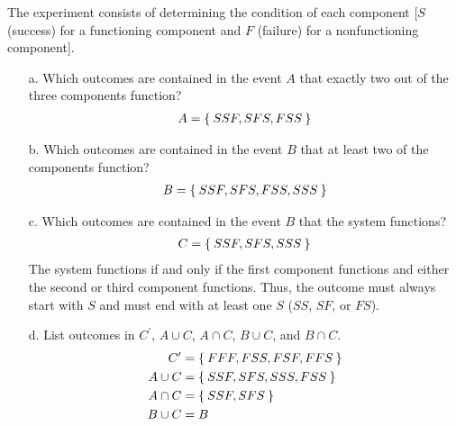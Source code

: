 \documentclass[letterpaper,12pt]{article}
\begin{document}
\begin{enumerate}
\begin{center}
    \end{center}
    The experiment consists of determining the condition of each component [$S$ (success) for a functioning component and $F$ (failure) for a nonfunctioning component].
    \begin{enumerate}
      \item[a.]
        Which outcomes are contained in the event $A$ that exactly two out of the three components function?
        \begin{align*}
          A = \Set{SSF, SFS, FSS}
        \end{align*}
      \item[b.]
        Which outcomes are contained in the event $B$ that at least two of the components function?
        \begin{align*}
          B = \Set{SSF, SFS, FSS, SSS}
        \end{align*}
      \item[c.]
        Which outcomes are contained in the event $B$ that the system functions?
        \begin{align*}
          C = \Set{SSF, SFS, SSS}
        \end{align*}
        The system functions if and only if the first component functions and either the second or third component functions. Thus, the outcome must always start with $S$ and must end with at least one $S$ ($SS$, $SF$, or $FS$).
      \item[d.]
        List outcomes in $C^\prime$, $A \cup C$, $A \cap C$, $B \cup C$, and $B \cap C$.
        \begin{align*}
          C^\prime &= \Set{FFF, FSS, FSF, FFS} \\
          A \cup C &= \Set{SSF, SFS, SSS, FSS} \\
          A \cap C &= \Set{SSF, SFS} \\
          B \cup C &= B \\

\end{align*}
\end{enumerate}
\end{enumerate}
\end{document}
